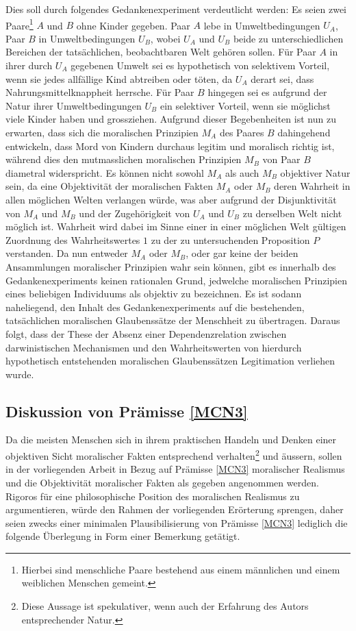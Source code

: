 \documentclass[a4paper,11pt]{article}
\numberwithin{equation}{section}
\begin{document}
Dies soll durch folgendes Gedankenexperiment verdeutlicht werden: Es seien zwei Paare\footnote{Hierbei sind menschliche Paare bestehend aus einem männlichen und einem weiblichen Menschen gemeint.} $A$ und $B$ ohne Kinder gegeben. Paar $A$ lebe in Umweltbedingungen $U_A$, Paar $B$ in Umweltbedingungen $U_B$, wobei $U_A$ und $U_B$ beide zu unterschiedlichen Bereichen der tatsächlichen, beobachtbaren Welt gehören sollen. Für Paar $A$ in ihrer durch $U_A$ gegebenen Umwelt sei es hypothetisch von selektivem Vorteil, wenn sie jedes allfällige Kind abtreiben oder töten, da $U_A$ derart sei, dass Nahrungsmittelknappheit herrsche. Für Paar $B$ hingegen sei es aufgrund der Natur ihrer Umweltbedingungen $U_B$ ein selektiver Vorteil, wenn sie möglichst viele Kinder haben und grossziehen. Aufgrund dieser Begebenheiten ist nun zu erwarten, dass sich die moralischen Prinzipien $M_A$ des Paares $B$ dahingehend entwickeln, dass Mord von Kindern durchaus legitim und moralisch richtig ist, während dies den mutmasslichen moralischen Prinzipien $M_B$ von Paar $B$ diametral widerspricht. Es können nicht sowohl $M_A$ als auch $M_B$ objektiver Natur sein, da eine Objektivität der moralischen Fakten $M_A$ oder $M_B$ deren Wahrheit in allen möglichen Welten verlangen würde, was aber aufgrund der Disjunktivität von $M_A$ und $M_B$ und der Zugehörigkeit von $U_A$ und $U_B$ zu derselben Welt nicht möglich ist. Wahrheit wird dabei im Sinne einer in einer möglichen Welt gültigen Zuordnung des Wahrheitswertes $1$ zu der zu untersuchenden Proposition $P$ verstanden. Da nun entweder $M_A$ oder $M_B$, oder gar keine der beiden Ansammlungen moralischer Prinzipien wahr sein können, gibt es innerhalb des Gedankenexperiments keinen rationalen Grund, jedwelche moralischen Prinzipien eines beliebigen Individuums als objektiv zu bezeichnen. Es ist sodann naheliegend, den Inhalt des Gedankenexperiments auf die bestehenden, tatsächlichen moralischen Glaubenssätze der Menschheit zu übertragen. Daraus folgt, dass der These der Absenz einer Dependenzrelation zwischen darwinistischen Mechanismen und den Wahrheitswerten von hierdurch hypothetisch entstehenden moralischen Glaubenssätzen Legitimation verliehen wurde.

\subsection{Diskussion von Prämisse \ref{MCN3}}
Da die meisten Menschen sich in ihrem praktischen Handeln und Denken einer objektiven Sicht moralischer Fakten entsprechend verhalten\footnote{Diese Aussage ist spekulativer, wenn auch der Erfahrung des Autors entsprechender Natur.} und äussern, sollen in der vorliegenden Arbeit in Bezug auf Prämisse \ref{MCN3} moralischer Realismus und die Objektivität moralischer Fakten als gegeben angenommen werden. Rigoros für eine philosophische Position des moralischen Realismus zu argumentieren, würde den Rahmen der vorliegenden Erörterung sprengen, daher seien zwecks einer minimalen Plausibilisierung von Prämisse \ref{MCN3} lediglich die folgende Überlegung in Form einer Bemerkung getätigt. 
\end{document}
